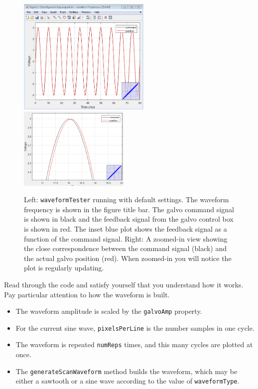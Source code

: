 \documentclass[a4paper]{report}
\begin{document}
\begin{figure}[h]
\centering
\includegraphics[width=2.5in]{waveformTester01.png}
\includegraphics[width=2.08in]{waveformTester01_zoom.png}
\caption{Left: \texttt{waveformTester} running with default settings. 
        The waveform frequency is shown in the figure title bar. 
        The galvo command signal is shown in black and the feedback signal from the galvo control box is shown in red. 
        The inset blue plot shows the feedback signal as a function of the command signal.
         Right: A zoomed-in view showing the close correspondence between the command signal (black) and the actual galvo position (red).
         When zoomed-in you will notice the plot is regularly updating.}
\label{waveformTester01}
\end{figure}


\noindent
Read through the code and satisfy yourself that you understand how it works. 
Pay particular attention to how the waveform is built. 

\begin{itemize}
    \setlength\itemsep{0.15em}
    \item The waveform amplitude is scaled by the \texttt{galvoAmp} property.
    \item For the current sine wave, \texttt{pixelsPerLine} is the number samples in one cycle. 
    \item The waveform is repeated \texttt{numReps} times, and this many cycles are plotted at once. 
    \item The \texttt{generateScanWaveform} method builds the waveform, which may be either a sawtooth or a sine wave according to the value of \texttt{waveformType}.
\end{itemize}
\end{document}
